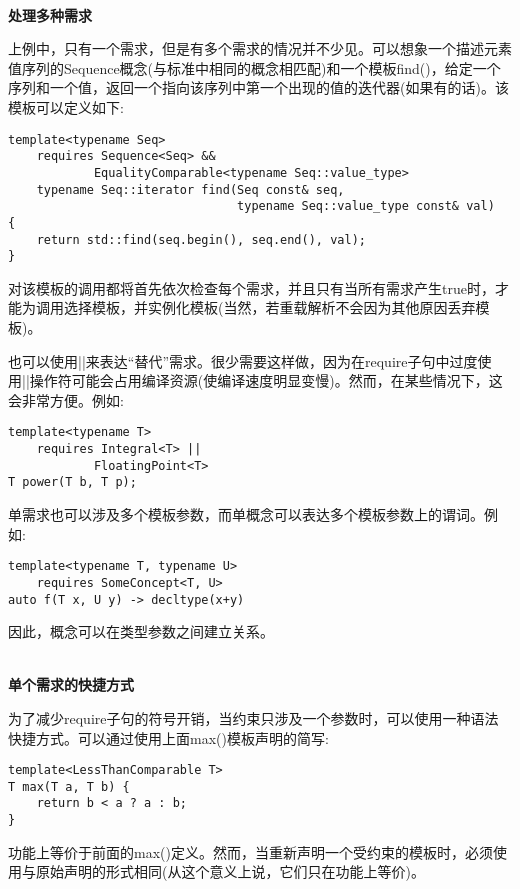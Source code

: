\hspace*{\fill} \\ %
\noindent
\textbf{处理多种需求}

上例中，只有一个需求，但是有多个需求的情况并不少见。可以想象一个描述元素值序列的Sequence概念(与标准中相同的概念相匹配)和一个模板find()，给定一个序列和一个值，返回一个指向该序列中第一个出现的值的迭代器(如果有的话)。该模板可以定义如下:

\begin{lstlisting}[style=styleCXX]
template<typename Seq>
	requires Sequence<Seq> &&
			EqualityComparable<typename Seq::value_type>
	typename Seq::iterator find(Seq const& seq,
								typename Seq::value_type const& val)
{
	return std::find(seq.begin(), seq.end(), val);
}
\end{lstlisting}

对该模板的调用都将首先依次检查每个需求，并且只有当所有需求产生true时，才能为调用选择模板，并实例化模板(当然，若重载解析不会因为其他原因丢弃模板)。

也可以使用||来表达“替代”需求。很少需要这样做，因为在require子句中过度使用||操作符可能会占用编译资源(使编译速度明显变慢)。然而，在某些情况下，这会非常方便。例如:

\begin{lstlisting}[style=styleCXX]
template<typename T>
	requires Integral<T> ||
			FloatingPoint<T>
T power(T b, T p);
\end{lstlisting}

单需求也可以涉及多个模板参数，而单概念可以表达多个模板参数上的谓词。例如:

\begin{lstlisting}[style=styleCXX]
template<typename T, typename U>
	requires SomeConcept<T, U>
auto f(T x, U y) -> decltype(x+y)
\end{lstlisting}

因此，概念可以在类型参数之间建立关系。

\hspace*{\fill} \\ %
\noindent
\textbf{单个需求的快捷方式}

为了减少require子句的符号开销，当约束只涉及一个参数时，可以使用一种语法快捷方式。可以通过使用上面max()模板声明的简写:

\begin{lstlisting}[style=styleCXX]
template<LessThanComparable T>
T max(T a, T b) {
	return b < a ? a : b;
}
\end{lstlisting}

功能上等价于前面的max()定义。然而，当重新声明一个受约束的模板时，必须使用与原始声明的形式相同(从这个意义上说，它们只在功能上等价)。

